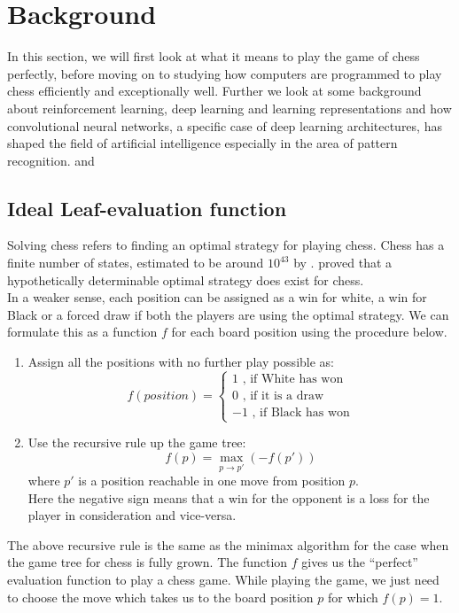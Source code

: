 \section{Background}
\label{chap:background}
In this section, we will first look at what it means to play the game 
of chess perfectly, before moving on to studying how computers are programmed 
to play 
chess efficiently and exceptionally well. Further we look at some background 
about reinforcement learning, deep learning and 
learning representations and how 
convolutional neural networks, a specific case of deep learning architectures, 
has shaped the field of artificial intelligence especially in the area of 
pattern recognition.%
and 
\subsection{Ideal Leaf-evaluation function}
\label{section:solving}
Solving chess refers to finding an optimal strategy for playing chess. Chess 
has 
a finite number of states, estimated to be around $10^{43}$ 
by \citet{shannon1950xxii}. \citet{zermelo1913anwendung} proved that a 
hypothetically determinable optimal strategy does exist for chess.\\
In a weaker sense, each position can be assigned as a win for white, a win for 
Black or a forced draw if both the players are using the optimal strategy. We 
can formulate this as a function $f$ for each board position using the 
procedure 
below.
\begin{enumerate}
\item Assign all the positions with no further play possible as:
\[f(position) = \begin{cases}
1 \text{ , if White has won}\\
0 \text{ , if it is a draw}\\
-1 \text{ , if Black has won}
\end{cases}\]
\item Use the recursive rule up the game tree:
\[f(p) = \max\limits_{p\rightarrow p'} (-f(p'))\]
where $p'$ is a position reachable in one move from position $p$.\\
Here the negative sign means that a win for the opponent is a loss for the 
player in consideration and vice-versa.
\end{enumerate} 
The above recursive rule is the same as the minimax algorithm for the case when 
the game tree for chess is fully grown. The function $f$ gives us the 
``perfect'' evaluation function to play a chess game. While playing the game, 
we 
just need to choose the move which takes us to the board position $p$ for which 
$f(p)=1$.\\

